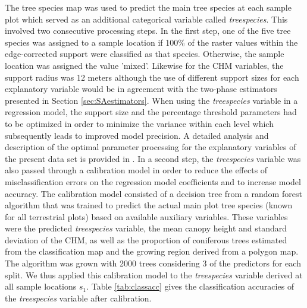 \documentclass[remotesensing,article,submit,moreauthors,pdftex,10pt,a4paper]{mdpi}
\begin{document}
The tree species map was used to predict the main tree species at each sample plot which served as an additional categorical variable called \textit{treespecies}. This involved two consecutive processing steps. In the first step, one of the five tree species was assigned to a sample location if 100\% of the raster values within the edge-corrected support were classified as that species. Otherwise, the sample location was assigned the value 'mixed'. Likewise for the CHM variables, the support radius was 12 meters although the use of different support sizes for each explanatory variable would be in agreement with the two-phase estimators presented in Section \ref{sec:SAestimators}. When using the \textit{treespecies} variable in a regression model, the support size and the percentage threshold parameters had to be optimized in order to minimize the variance within each level which subsequently leads to improved model precision. A detailed analysis and description of the optimal parameter processing for the explanatory variables of the present data set is provided in \citet{hill2017a}. In a second step, the \textit{treespecies} variable was also passed through a calibration model in order to reduce the effects of misclassification errors on the regression model coefficients and to increase model accuracy. The calibration model consisted of a decision tree from a random forest algorithm \citep{breiman2001} that was trained to predict the actual main plot tree species (known for all terrestrial plots) based on available auxiliary variables. These variables were the predicted \textit{treespecies} variable, the mean canopy height and standard deviation of the CHM, as well as the proportion of coniferous trees estimated from the classification map and the growing region derived from a polygon map. The algorithm was grown with 2000 trees considering 3 of the predictors for each split. We thus applied this calibration model to the \textit{treespecies} variable derived at all sample locations $s_1$. Table \ref{tab:classacc} gives the classification accuracies \citep{congalton2008} of the \textit{treespecies} variable after calibration.
\end{document}
